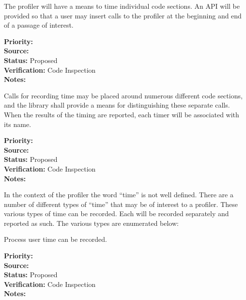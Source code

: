 

The profiler will have a means to time individual code sections.  An API will be 
provided so that a user may insert calls to the profiler at the beginning and
end of a passage of interest.

\begin{reqlist}
{\bf Priority:} \\
{\bf Source:}  \\
{\bf Status:} Proposed \\
{\bf Verification:} Code Inspection \\
{\bf Notes:} 
\end{reqlist}


Calls for recording time may be placed around numerous different code sections, 
and the library shall provide a means for distinguishing these separate calls.  When
the results of the timing are reported, each timer will be associated with its name.

\begin{reqlist}
{\bf Priority:} \\
{\bf Source:}  \\
{\bf Status:} Proposed \\
{\bf Verification:} Code Inspection \\
{\bf Notes:} 
\end{reqlist}


In the context of the profiler the word ``time'' is not well defined.  There are
a number of different types of ``time'' that may be of interest to a profiler.
These various types of time can be recorded.  Each will be recorded separately and reported
as such.  The various types are enumerated below:


Process user time can be recorded.

\begin{reqlist}
{\bf Priority:}  \\
{\bf Source:}  \\
{\bf Status:} Proposed \\
{\bf Verification:} Code Inspection \\
{\bf Notes:} 
\end{reqlist}



